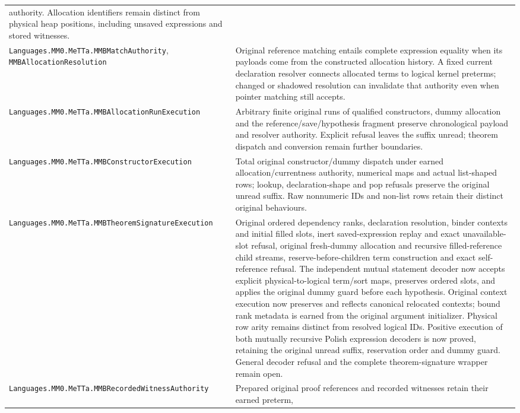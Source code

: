 \documentclass[11pt]{article}
\newcommand{\code}[1]{\nolinkurl{#1}}
\begin{document}
{\begin{longtable}{>{\raggedright\arraybackslash}p{.39\linewidth}>{\raggedright\arraybackslash}p{.55\linewidth}}
  authority. Allocation identifiers remain distinct from physical heap
  positions, including unsaved expressions and stored witnesses.\\
\code{Languages.MM0.MeTTa.MMBMatchAuthority}, \code{MMBAllocationResolution} &
  Original reference matching entails complete expression equality when its
  payloads come from the constructed allocation history. A fixed current
  declaration resolver connects allocated terms to logical kernel preterms;
  changed or shadowed resolution can invalidate that authority even when
  pointer matching still accepts.\\
\code{Languages.MM0.MeTTa.MMBAllocationRunExecution} & Arbitrary finite
  original runs of qualified constructors, dummy allocation and the
  reference/save/hypothesis fragment preserve chronological payload and
  resolver authority. Explicit refusal leaves the suffix unread;
  theorem dispatch and conversion remain further boundaries.\\
\code{Languages.MM0.MeTTa.MMBConstructorExecution} & Total original
  constructor/dummy dispatch under earned allocation/currentness authority,
  numerical maps and actual list-shaped rows; lookup, declaration-shape and
  pop refusals preserve the original unread suffix. Raw nonnumeric IDs and
  non-list rows retain their distinct original behaviours.\\
\code{Languages.MM0.MeTTa.MMBTheoremSignatureExecution} & Original ordered
  dependency ranks, declaration resolution, binder contexts and initial
  filled slots, inert saved-expression replay and exact unavailable-slot
  refusal, original fresh-dummy allocation and recursive filled-reference
  child streams, reserve-before-children term construction and exact
  self-reference refusal. The independent mutual statement decoder now accepts
  explicit physical-to-logical term/sort maps, preserves ordered slots, and
  applies the original dummy guard before each hypothesis. Original context
  execution now preserves and reflects canonical relocated contexts; bound
  rank metadata is earned from the original argument initializer. Physical
  row arity remains distinct from resolved logical IDs. Positive execution of both mutually recursive Polish expression decoders
  is now proved, retaining the original unread suffix, reservation order
  and dummy guard. General decoder refusal and the complete theorem-signature
  wrapper remain open.\\
\code{Languages.MM0.MeTTa.MMBRecordedWitnessAuthority} & Prepared original
  proof references and recorded witnesses retain their earned preterm,

\end{longtable}}
\end{document}
